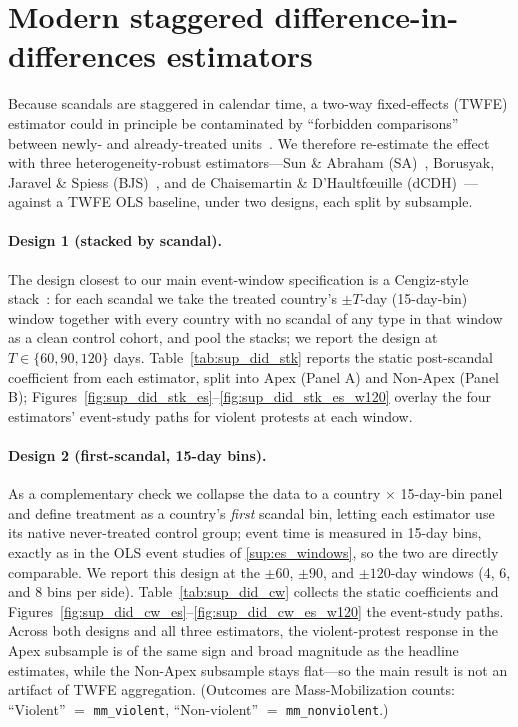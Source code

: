 \documentclass[11pt]{article}
\begin{document}
\clearpage
\section{Modern staggered difference-in-differences estimators}\label{sup:did}

Because scandals are staggered in calendar time, a two-way fixed-effects (TWFE) estimator could in principle be contaminated by ``forbidden comparisons'' between newly- and already-treated units~\citep{decade2024dcdh,goodmanbacon2021difference}. We therefore re-estimate the effect with three heterogeneity-robust estimators---Sun \& Abraham (SA)~\citep{sun2021estimating}, Borusyak, Jaravel \& Spiess (BJS)~\citep{borusyak2024revisiting}, and de Chaisemartin \& D'Haultf{\oe}uille (dCDH)~\citep{decade2024dcdh}---against a TWFE OLS baseline, under two designs, each split by subsample.

\paragraph{Design 1 (stacked by scandal).} The design closest to our main event-window specification is a Cengiz-style stack~\citep{cengiz2019effect}: for each scandal we take the treated country's $\pm T$-day (15-day-bin) window together with every country with no scandal of any type in that window as a clean control cohort, and pool the stacks; we report the design at $T\in\{60,90,120\}$ days. Table~\ref{tab:sup_did_stk} reports the static post-scandal coefficient from each estimator, split into Apex (Panel A) and Non-Apex (Panel B); Figures~\ref{fig:sup_did_stk_es}--\ref{fig:sup_did_stk_es_w120} overlay the four estimators' event-study paths for violent protests at each window.

\paragraph{Design 2 (first-scandal, 15-day bins).} As a complementary check we collapse the data to a country $\times$ 15-day-bin panel and define treatment as a country's \emph{first} scandal bin, letting each estimator use its native never-treated control group; event time is measured in 15-day bins, exactly as in the OLS event studies of \autoref{sup:es_windows}, so the two are directly comparable. We report this design at the $\pm 60$, $\pm 90$, and $\pm 120$-day windows (4, 6, and 8 bins per side). Table~\ref{tab:sup_did_cw} collects the static coefficients and Figures~\ref{fig:sup_did_cw_es}--\ref{fig:sup_did_cw_es_w120} the event-study paths. Across both designs and all three estimators, the violent-protest response in the Apex subsample is of the same sign and broad magnitude as the headline estimates, while the Non-Apex subsample stays flat---so the main result is not an artifact of TWFE aggregation. (Outcomes are Mass-Mobilization counts: ``Violent'' $=$ \texttt{mm\_violent}, ``Non-violent'' $=$ \texttt{mm\_nonviolent}.)
\end{document}
